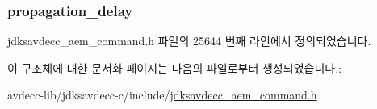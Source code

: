 \subsubsection[{\texorpdfstring{propagation\+\_\+delay}{propagation_delay}}]{ propagation\+\_\+delay}\hypertarget{structjdksavdecc__aem__command__get__avb__info__response_a13e128d252d16617c804f78274446eb0}{}\label{structjdksavdecc__aem__command__get__avb__info__response_a13e128d252d16617c804f78274446eb0}


jdksavdecc\+\_\+aem\+\_\+command.\+h 파일의 25644 번째 라인에서 정의되었습니다.



이 구조체에 대한 문서화 페이지는 다음의 파일로부터 생성되었습니다.\+:\begin{DoxyCompactItemize}
\item 
avdecc-\/lib/jdksavdecc-\/c/include/\hyperlink{jdksavdecc__aem__command_8h}{jdksavdecc\+\_\+aem\+\_\+command.\+h}\end{DoxyCompactItemize}
